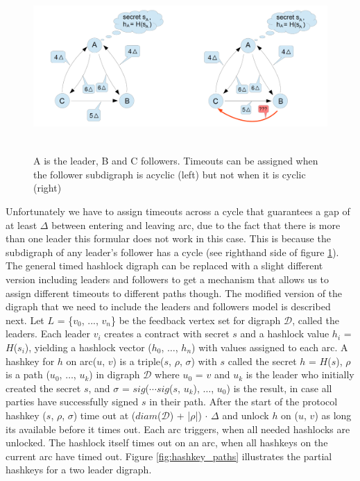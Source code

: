 
\begin{figure}[h]
	\includegraphics[height=6.5cm]{timeouts_subdigraph}	%
	\caption{A is the leader, B and C followers. Timeouts can be assigned when the follower subdigraph is acyclic (left) but not when it is cyclic (right)}
	\label{fig:timeouts_subdigraph}
\end{figure}

Unfortunately we have to assign timeouts across a cycle that guarantees a gap of at least $\Delta$ between entering and leaving arc, due to the fact that there is more than one leader this formular does not work in this case. This is because the subdigraph of any leader's follower has a cycle (see righthand side of figure \ref{fig:timeouts_subdigraph}). The general timed hashlock digraph can be replaced with a slight different version including leaders and followers to get a mechanism that allows us to assign different timeouts to different paths though. The modified version of the digraph that we need to include the leaders and followers model is described next. Let $L$ = \{$v_0$, ..., $v_n$\} be the feedback vertex set for digraph $\mathcal{D}$, called the leaders. Each leader $v_i$ creates a contract with secret $s$ and a hashlock value $h_i$ = $H$($s_i$), yielding a hashlock vector ($h_0$, $\dots$, $h_n$) with values assigned to each arc. A hashkey for $h$ on arc($u$, $v$) is a triple($s$, $\rho$, $\sigma$) with $s$ called the secret $h$ = $H$($s$), $\rho$ is a path ($u_0$, $\dots$, $u_k$) in digraph $\mathcal{D}$ where $u_0$ = $v$ and $u_k$ is the leader who initially created the secret $s$, and $\sigma$ = $sig$($\cdots$$sig$($s$, $u_k$), $\dots$, $u_0$) is the result, in case all parties have successfully signed $s$ in their path. After the start of the protocol hashkey ($s$, $\rho$, $\sigma$) time out at ($diam$($\mathcal{D}$) + |$\rho$|) $\cdot$ $\Delta$ and unlock $h$ on ($u$, $v$) as long its available before it times out. Each arc triggers, when all needed hashlocks are unlocked. The hashlock itself times out on an arc, when all hashkeys on the current arc have timed out. Figure \ref{fig:hashkey_paths} illustrates the partial hashkeys for a two leader digraph.

